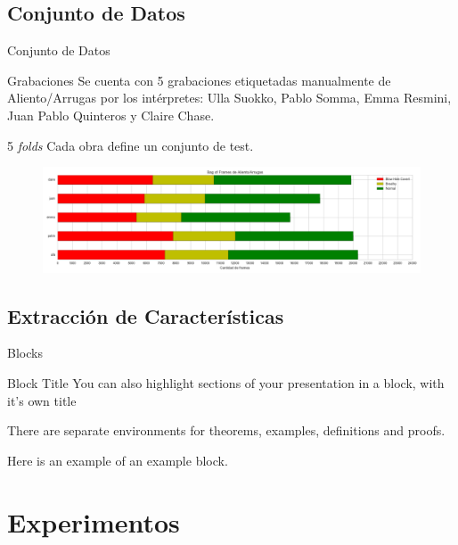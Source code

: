 \documentclass[aspectratio=169]{beamer}
\begin{document}
\subsection{Conjunto de Datos}

\begin{frame}{Conjunto de Datos}
\begin{block}{Grabaciones}
Se cuenta con 5 grabaciones etiquetadas manualmente de Aliento/Arrugas por los intérpretes: Ulla Suokko, Pablo Somma, Emma Resmini, Juan Pablo Quinteros y Claire Chase.
\end{block}
\begin{block}{5 \textit{folds}}
Cada obra define un conjunto de test. 
\end{block}

\begin{figure}[H]
\begin{center}
\includegraphics[width=1\textwidth]{dataset}
\end{center}
\end{figure}
\end{frame}

\subsection{Extracción de Características}

\begin{frame}{Blocks}
\begin{block}{Block Title}
You can also highlight sections of your presentation in a block, with it's own title
\end{block}
\begin{theorem}
There are separate environments for theorems, examples, definitions and proofs.
\end{theorem}
\begin{example}
Here is an example of an example block.
\end{example}
\end{frame}

\section{Experimentos}
\end{document}
